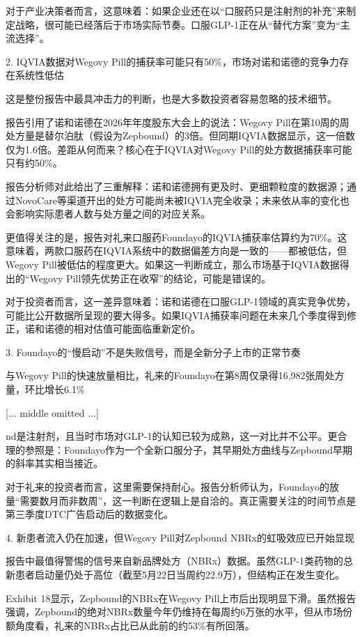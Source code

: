 \documentclass[11pt]{ctexart}
\begin{document}
对于产业决策者而言，这意味着：如果企业还在以“口服药只是注射剂的补充”来制定战略，很可能已经落后于市场实际节奏。口服GLP-1正在从“替代方案”变为“主流选择”。

2. IQVIA数据对Wegovy Pill的捕获率可能只有50\%，市场对诺和诺德的竞争力存在系统性低估

这是整份报告中最具冲击力的判断，也是大多数投资者容易忽略的技术细节。

报告引用了诺和诺德在2026年年度股东大会上的说法：Wegovy Pill在第10周的周处方量是替尔泊肽（假设为Zepbound）的3倍。但同期IQVIA数据显示，这一倍数仅为1.6倍。差距从何而来？核心在于IQVIA对Wegovy Pill的处方数据捕获率可能只有约50\%。

报告分析师对此给出了三重解释：诺和诺德拥有更及时、更细颗粒度的数据源；通过NovoCare等渠道开出的处方可能尚未被IQVIA完全收录；未来依从率的变化也会影响实际患者人数与处方量之间的对应关系。

更值得关注的是，报告对礼来口服药Foundayo的IQVIA捕获率估算约为70\%。这意味着，两款口服药在IQVIA系统中的数据偏差方向是一致的——都被低估，但Wegovy Pill被低估的程度更大。如果这一判断成立，那么市场基于IQVIA数据得出的“Wegovy Pill领先优势正在收窄”的结论，可能是错误的。

对于投资者而言，这一差异意味着：诺和诺德在口服GLP-1领域的真实竞争优势，可能比公开数据所呈现的要大得多。如果IQVIA捕获率问题在未来几个季度得到修正，诺和诺德的相对估值可能面临重新定价。

3. Foundayo的“慢启动”不是失败信号，而是全新分子上市的正常节奏

与Wegovy Pill的快速放量相比，礼来的Foundayo在第8周仅录得16,982张周处方量，环比增长6.1\%

[... middle omitted ...]

nd是注射剂，且当时市场对GLP-1的认知已较为成熟，这一对比并不公平。更合理的参照是：Foundayo作为一个全新口服分子，其早期处方曲线与Zepbound早期的斜率其实相当接近。

对于礼来的投资者而言，这里需要保持耐心。报告分析师认为，Foundayo的放量“需要数月而非数周”，这一判断在逻辑上是自洽的。真正需要关注的时间节点是第三季度DTC广告启动后的数据变化。

4. 新患者流入仍在加速，但Wegovy Pill对Zepbound NBRx的虹吸效应已开始显现

报告中最值得警惕的信号来自新品牌处方（NBRx）数据。虽然GLP-1类药物的总新患者启动量仍处于高位（截至5月22日当周约22.9万），但结构正在发生变化。

Exhibit 18显示，Zepbound的NBRx在Wegovy Pill上市后出现明显下滑。虽然报告强调，Zepbound的绝对NBRx数量今年仍维持在每周约6万张的水平，但从市场份额角度看，礼来的NBRx占比已从此前的约53\%有所回落。
\end{document}

